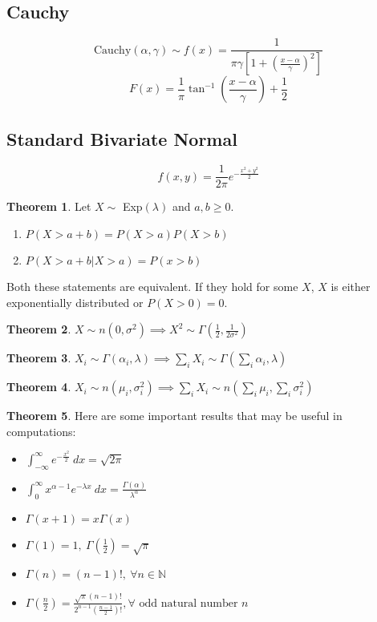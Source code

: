 \documentclass[10pt, a4paper]{extarticle}
\theoremstyle{definition}
\newtheorem{thm}{Theorem}
\begin{document}
	\subsection{Cauchy}
	\[\text{Cauchy}(\alpha,\gamma)\sim f(x)=\frac{1}{\pi\gamma\left[1+\left(\frac{x-\alpha}{\gamma}\right)^2\right]}\]
	\[F(x)=\frac{1}{\pi}\tan^{-1}\left(\frac{x-\alpha}{\gamma}\right)+\frac{1}{2}\]

	\subsection{Standard Bivariate Normal}
	\[f(x,y)=\frac{1}{2\pi}e^{-\frac{x^2+y^2}{2}}\]

	\begin{thm}
		Let $X\sim$ Exp$(\lambda)$ and $a,b\geq 0$.
		\begin{enumerate}
			\item $P(X>a+b)=P(X>a)P(X>b)$
			\item $P(X>a+b|X>a)=P(x>b)$
	\end{enumerate}
	Both these statements are equivalent. If they hold for some $X$, $X$ is either exponentially distributed or $P(X>0)=0$.
	\end{thm}

	\begin{thm}
		$X\sim n(0,\sigma^2)\implies X^2\sim \Gamma\left(\frac{1}{2},\frac{1}{2\sigma^2}\right)$
	\end{thm}

	\begin{thm}
		$X_i\sim\Gamma(\alpha_i,\lambda)\implies \sum_iX_i\sim \Gamma(\sum_i\alpha_i,\lambda)$
	\end{thm}

	\begin{thm}
		$X_i\sim n(\mu_i,\sigma_i^2)\implies \sum_iX_i\sim n(\sum_i\mu_i,\sum_i\sigma_i^2)$
	\end{thm}

	\begin{thm}
		Here are some important results that may be useful in computations:
		\begin{itemize}
			\item $\int_{-\infty}^{\infty}e^{-\frac{x^2}{2}}\ dx=\sqrt{2\pi}$
			\item $\int_0^{\infty} x^{\alpha-1}e^{-\lambda x}\ dx=\frac{\Gamma(\alpha)}{\lambda^\alpha}$
			\item $\Gamma(x+1)=x\Gamma(x)$
			\item $\Gamma(1)=1,\ \Gamma\left(\frac{1}{2}\right)=\sqrt{\pi}$
			\item $\Gamma(n)=(n-1)!,\ \forall n\in\mathbb{N}$
			\item $\Gamma\left(\frac{n}{2}\right)=\frac{\sqrt{\pi}(n-1)!}{2^{n-1}\left(\frac{n-1}{2}\right)!}, \forall \text{ odd natural number }n$
		\end{itemize}
	\end{thm}
\end{document}
